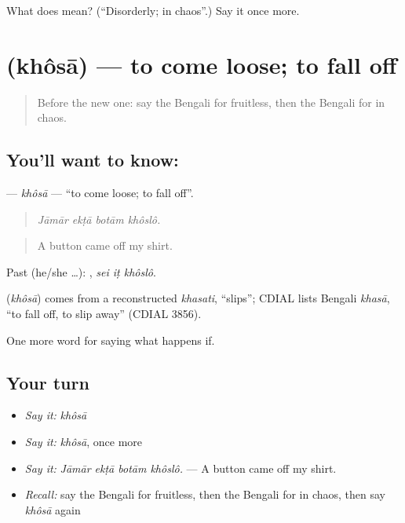 \begin{tcolorbox}[breakable,colback=teal!4,colframe=teal!35!black,title={Before you move on}]
What does  mean? (\textquotedblleft{}Disorderly; in chaos\textquotedblright{}.) Say it once more.
\end{tcolorbox}
\section[\texorpdfstring{\bn{খসা} (khôsā)}{খসা (khôsā)}]{ (khôsā) — to come loose; to fall off}

\label{lesson:BN-C542-khosa}



\begin{quote}
Before the new one: say the Bengali for fruitless, then the Bengali for in chaos.
\end{quote}

\subsection*{You'll want to know: }
\textbf{} — \emph{khôsā} — \textquotedblleft{}to come loose; to fall off\textquotedblright{}.

\begin{quote}
   
\end{quote}

\begin{quote}
\emph{Jāmār ekṭā botām khôslô.}
\end{quote}

\begin{quote}
A button came off my shirt.
\end{quote}

Past (he/she …):   , \emph{sei iṭ khôslô}.

\begin{cousinweb}
\textbf{} (\emph{khôsā}) comes from a reconstructed \emph{khasati}, \textquotedblleft{}slips\textquotedblright{}; CDIAL lists Bengali \emph{khasā}, \textquotedblleft{}to fall off, to slip away\textquotedblright{} (CDIAL 3856).
\end{cousinweb}

\begin{grammarlens}[title={What you've built}]
One more word for saying what happens if.
\end{grammarlens}

\subsection*{Your turn}
\begin{itemize}
\raggedright
  \item \emph{Say it:} \emph{khôsā}
  \item \emph{Say it:} \emph{khôsā}, once more
  \item \emph{Say it:} \emph{Jāmār ekṭā botām khôslô.} — A button came off my shirt.
  \item \emph{Recall:} say the Bengali for fruitless, then the Bengali for in chaos, then say \emph{khôsā} again
\end{itemize}

